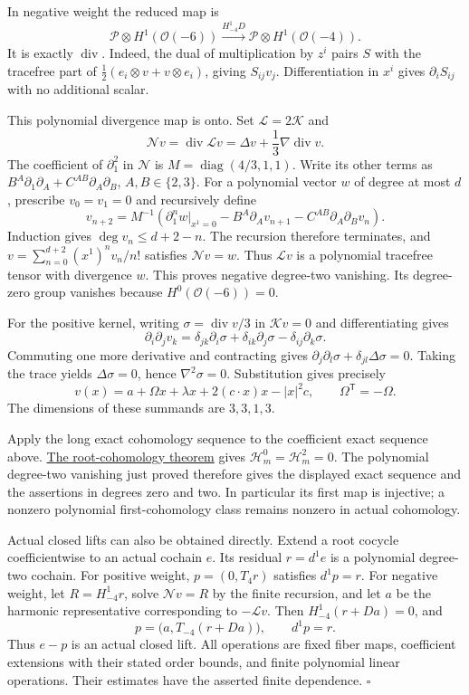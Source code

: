 \documentclass[
  english,
  11pt,
  reqno]{amsart}
\begin{document}
In negative weight the reduced map is \[
\mathcal P\otimes H^1(\mathcal O(-6))
\xrightarrow{H_{-4}^1D}\mathcal P\otimes H^1(\mathcal O(-4)).
\] It is exactly \(\operatorname{div}\). Indeed, the dual of
multiplication by \(z^i\) pairs \(S\) with the tracefree part of
\(\tfrac12(e_i\otimes v+v\otimes e_i)\), giving \(S_{ij}v_j\).
Differentiation in \(x^i\) gives \(\partial_iS_{ij}\) with no additional
scalar.

This polynomial divergence map is onto. Set \(\mathcal L=2\mathcal K\)
and \[
\mathcal N v=\operatorname{div}\mathcal Lv
=\Delta v+\frac13\nabla\operatorname{div}v.
\] The coefficient of \(\partial_1^2\) in \(\mathcal N\) is
\(M=\operatorname{diag}(4/3,1,1)\). Write its other terms as
\(B^A\partial_1\partial_A+C^{AB}\partial_A\partial_B\),
\(A,B\in\{2,3\}\). For a polynomial vector \(w\) of degree at most
\(d\), prescribe \(v_0=v_1=0\) and recursively define%
 \[
v_{n+2}=M^{-1}\left(
\partial_1^n w|_{x^1=0}
-B^A\partial_Av_{n+1}
-C^{AB}\partial_A\partial_Bv_n
\right).
\] Induction gives \(\deg v_n\le d+2-n\). The recursion therefore
terminates, and \(v=\sum_{n=0}^{d+2}(x^1)^nv_n/n!\) satisfies
\(\mathcal Nv=w\). Thus \(\mathcal Lv\) is a polynomial tracefree tensor
with divergence \(w\). This proves negative degree-two vanishing. Its
degree-zero group vanishes because \(H^0(\mathcal O(-6))=0\).

For the positive kernel, writing \(\sigma=\operatorname{div}v/3\) in
\(\mathcal Kv=0\) and differentiating gives \[
\partial_i\partial_jv_k
=\delta_{jk}\partial_i\sigma
+\delta_{ik}\partial_j\sigma
-\delta_{ij}\partial_k\sigma.
\] Commuting one more derivative and contracting gives
\(\partial_j\partial_l\sigma+\delta_{jl}\Delta\sigma=0\). Taking the
trace yields \(\Delta\sigma=0\), hence \(\nabla^2\sigma=0\).
Substitution gives precisely \[
v(x)=a+\Omega x+\lambda x+2(c\cdot x)x-|x|^2c,
\qquad \Omega^{\mathsf T}=-\Omega.
\] The dimensions of these summands are \(3,3,1,3\).

Apply the long exact cohomology sequence to the coefficient exact
sequence above. \hyperref[thm:online-moderate-root-cohomology]{The
root-cohomology theorem} gives \(\mathscr H_m^0=\mathscr H_m^2=0\). The
polynomial degree-two vanishing just proved therefore gives the
displayed exact sequence and the assertions in degrees zero and two. In
particular its first map is injective; a nonzero polynomial
first-cohomology class remains nonzero in actual cohomology.

Actual closed lifts can also be obtained directly. Extend a root cocycle
coefficientwise to an actual cochain \(e\). Its residual \(r=d^1e\) is a
polynomial degree-two cochain. For positive weight, \(p=(0,T_4r)\)
satisfies \(d^1p=r\). For negative weight, let \(R=H_{-4}^1r\), solve
\(\mathcal Nv=R\) by the finite recursion, and let \(a\) be the harmonic
representative corresponding to \(-\mathcal Lv\). Then
\(H_{-4}^1(r+Da)=0\), and \[
p=\bigl(a,T_{-4}(r+Da)\bigr),\qquad d^1p=r.
\] Thus \(e-p\) is an actual closed lift. All operations are fixed fiber
maps, coefficient extensions with their stated order bounds, and finite
polynomial linear operations. Their estimates have the asserted finite
dependence. \hfill\(\square\)
\end{document}
